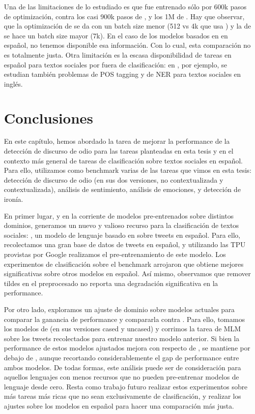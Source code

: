 Una de las limitaciones de lo estudiado es que \robertuito{} fue entrenado sólo por 600k pasos de optimización, contra los casi 900k pasos de \beto{}, y los 1M de \bertweet{}. Hay que observar, que la optimización de \beto{} se da con un batch size menor (512 vs 4k que usa \robertuito{}) y la de \bertweet{} se hace un batch size mayor (7k). En el caso de los modelos basados en \roberta{} en español, no tenemos disponible esa información. Con lo cual, esta comparación no es totalmente justa. Otra limitación es la escasa disponibilidad de tareas en español para textos sociales por fuera de clasificación: en \citet{bertweet}, por ejemplo, se estudian también problemas de POS tagging y de NER para textos sociales en inglés.

\section{Conclusiones}

En este capítulo, hemos abordado la tarea de mejorar la performance de la detección de discurso de odio para las tareas planteadas en esta tesis y en el contexto más general de tareas de clasificación sobre textos sociales en español. Para ello, utilizamos como benchmark varias de las tareas que vimos en esta tesis: detección de discurso de odio (en sus dos versiones, no contextualizada y contextualizada), análisis de sentimiento, análisis de emociones, y detección de ironía.

En primer lugar, y en la corriente de modelos pre-entrenados sobre distintos dominios, generamos un nuevo y valioso recurso para la clasificación de textos sociales: \robertuito{}, un modelo de lenguaje basado en \roberta{} sobre tweets en español. Para ello, recolectamos una gran base de datos de tweets en español, y utilizando las TPU provistas por Google realizamos el pre-entrenamiento de este modelo. Los experimentos de clasificación sobre el benchmark arrojaron que \robertuito{} obtiene mejores significativas sobre otros modelos en español. Así mismo, observamos que remover tildes en el preprocesado no reporta una degradación significativa en la performance.

Por otro lado, exploramos un ajuste de dominio sobre modelos actuales para comparar la ganancia de performance y compararla contra \robertuito{}. Para ello, tomamos los modelos de \beto{} (en sus versiones cased y uncased) y corrimos la tarea de MLM sobre los tweets recolectados para entrenar nuestro modelo anterior. Si bien la performance de estos modelos ajustados mejora con respecto de \beto{}, se mantiene por debajo de \robertuito{}, aunque recortando considerablemente el gap de performance entre ambos modelos. De todas formas, este análisis puede ser de consideración para aquellos lenguajes con menos recursos que no pueden pre-entrenar modelos de lenguaje desde cero. Resta como trabajo futuro realizar estos experimentos sobre más tareas más ricas que no sean exclusivamente de clasificación, y realizar los ajustes sobre los modelos \roberta{} en español para hacer una comparación más justa.

